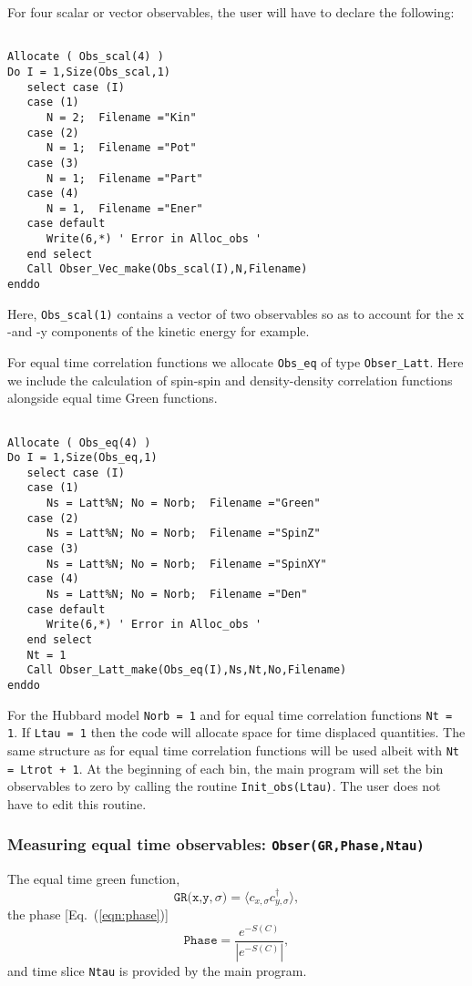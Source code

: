  For  four scalar  or vector observables,  the user will have to  declare the following: 
\begin{lstlisting}

Allocate ( Obs_scal(4) )
Do I = 1,Size(Obs_scal,1)
   select case (I)
   case (1)
      N = 2;  Filename ="Kin"
   case (2)
      N = 1;  Filename ="Pot"
   case (3)
      N = 1;  Filename ="Part"
   case (4)
      N = 1,  Filename ="Ener"
   case default
      Write(6,*) ' Error in Alloc_obs '  
   end select
   Call Obser_Vec_make(Obs_scal(I),N,Filename)
enddo
\end{lstlisting}
Here,   \texttt{Obs\_scal(1)}   contains a vector  of two observables  so as to account for the x -and -y components of the kinetic energy for example.  

For equal time correlation  functions  we allocate  \texttt{Obs\_eq}  of type \texttt{Obser\_Latt}.  Here we include the calculation of spin-spin and density-density correlation functions alongside equal time Green functions. 
\begin{lstlisting}

Allocate ( Obs_eq(4) )
Do I = 1,Size(Obs_eq,1)
   select case (I)
   case (1)
      Ns = Latt%N; No = Norb;  Filename ="Green"
   case (2)
      Ns = Latt%N; No = Norb;  Filename ="SpinZ"
   case (3)
      Ns = Latt%N; No = Norb;  Filename ="SpinXY"
   case (4)
      Ns = Latt%N; No = Norb;  Filename ="Den"
   case default
      Write(6,*) ' Error in Alloc_obs '  
   end select
   Nt = 1
   Call Obser_Latt_make(Obs_eq(I),Ns,Nt,No,Filename)
enddo
 \end{lstlisting} 
 For the Hubbard model \texttt{Norb = 1} and for   equal time correlation functions   \texttt{Nt = 1}.       If  \texttt{Ltau = 1}  then the code will allocate space for  time displaced quantities.   The same structure as for  equal time correlation functions will be used albeit with  \texttt{Nt = Ltrot + 1}.  At the beginning of each bin, the main program will set the bin observables to zero by calling  the routine 
 \texttt{Init\_obs(Ltau)}.   The user does not have to edit this routine. 
 
\subsubsection{Measuring equal time observables: \texttt{Obser(GR,Phase,Ntau)}}


The equal time  green function,
\begin{equation}
	 \texttt{GR(x,y},\sigma{\texttt)}  = \langle c^{\phantom{\dagger}}_{x,\sigma} c^{\dagger}_{y,\sigma}  \rangle,
\end{equation}
the  phase [Eq.~(\ref{eqn:phase})]
\begin{equation}
	\texttt{Phase} =  \frac{e^{-S(C)}} { \left| e^{-S(C)} \right| },
\end{equation}
and time slice \texttt{Ntau}   is provided by the main program.  

